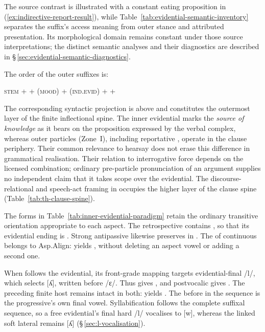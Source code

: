 The source contrast is illustrated with a constant eating proposition in
(\ref{ex:indirective-report-result}), while
Table~\ref{tab:evidential-semantic-inventory} separates the suffix's
access meaning from outer stance and attributed presentation. Its
morphological domain remains constant under those source interpretations;
the distinct semantic analyses and their diagnostics are described in
§\,\ref{sec:evidential-semantic-diagnostics}.

The order of the outer suffixes is:

\begin{center}
\textsc{stem} +  + (\textsc{mood}) +
(\textsc{ind.evid}) +  + 
\end{center}

\noindent The corresponding syntactic projection is above
 and constitutes the outermost layer of the finite inflectional
spine. The inner evidential marks the \emph{source of knowledge} as it
bears on the proposition expressed by the verbal complex, whereas outer
 particles (Zone~I), including reportative ,
operate in the clause periphery. Their common relevance to hearsay does
not erase this difference in grammatical realisation. Their relation to
interrogative force depends on the licensed combination; ordinary
pre-particle pronunciation of an argument supplies no independent claim
that it takes scope over the evidential. The discourse-relational and
speech-act framing in
 occupies the higher layer of the clause spine
(Table~\ref{tab:th-clause-spine}).



The forms in Table~\ref{tab:inner-evidential-paradigm} retain the ordinary
transitive orientation appropriate to each aspect. The retrospective
contains , so that its evidential ending is
. Strong antipassive  likewise preserves
 in . The  of continuous  belongs to
Asp.Align:  yields , without deleting an
aspect vowel or adding a second one.

When  follows the evidential, its front-grade mapping targets
evidential-final /l/, which selects [ʎ], written  before /ɛ/. Thus
 gives , and postvocalic  gives
. The preceding finite host remains intact in both:
 yields . The  before
 in the sequence  is the progressive's own final vowel.
Syllabification follows the complete suffixal sequence, so a free
evidential's final hard /l/ vocalises to [w], whereas the linked soft
lateral remains [ʎ] (§\,\ref{sec:l-vocalisation}).

